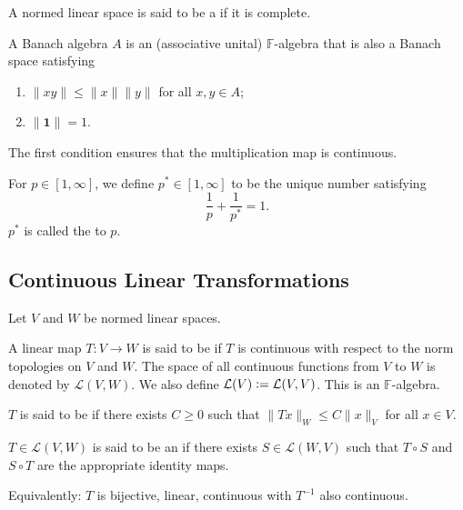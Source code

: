 \documentclass[12pt]{article}	%
\begin{document}
\begin{defn}
	A normed linear space is said to be a  if it is complete.
\end{defn}

\begin{defn}
	A Banach algebra $A$ is an (associative unital) $\mathbb{F}$-algebra that is also a Banach space satisfying 
	\begin{enumerate}
		\item $\|xy\| \le \|x\| \|y\|$ for all $x, y \in A$;
		\item $\|\mathbf{1}\| = 1$.
	\end{enumerate}
\end{defn}
The first condition ensures that the multiplication map is continuous.

\begin{defn}
	For $p \in [1, \infty]$, we define $p^{\ast} \in [1, \infty]$ to be the unique number satisfying
	\begin{equation*} 
		\frac{1}{p} + \frac{1}{p^{\ast}} = 1.
	\end{equation*}
	$p^{\ast}$ is called the  to $p$.
\end{defn}

\subsection{Continuous Linear Transformations}

\begin{defn}
	Let $V$ and $W$ be normed linear spaces. 

	A linear map $T : V \to W$ is said to be  if $T$ is continuous with respect to the norm topologies on $V$ and $W$. The space of all continuous functions from $V$ to $W$ is denoted by $\mathcal{L}(V, W)$. We also define $\mathcal{L}(V) \vcentcolon= \mathcal{L}(V, V)$. This is an $\mathbb{F}$-algebra.

	$T$ is said to be  if there exists $C \ge 0$ such that $\|Tx\|_{W} \le C \|x\|_{V}$ for all $x \in V$. 
\end{defn}

\begin{defn}
	$T \in \mathcal{L}(V, W)$ is said to be an  if there exists $S \in \mathcal{L}(W, V)$ such that $T \circ S$ and $S \circ T$ are the appropriate identity maps.
\end{defn}
Equivalently: $T$ is bijective, linear, continuous with $T^{-1}$ also continuous.
\end{document}
